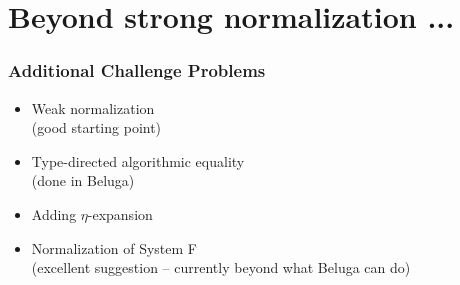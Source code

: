 \documentclass{beamer}
\begin{document}


\section{Beyond strong normalization ...}


\begin{frame}
  \frametitle{Additional Challenge Problems}
  \begin{itemize}
  \item Weak normalization \\
  (good starting point)

  \item Type-directed algorithmic equality\\
(done in Beluga)

  \item Adding $\eta$-expansion

  \item Normalization of System F \\
   (excellent suggestion -- currently beyond what Beluga can do)
  \end{itemize}

\end{frame}
\end{document}
